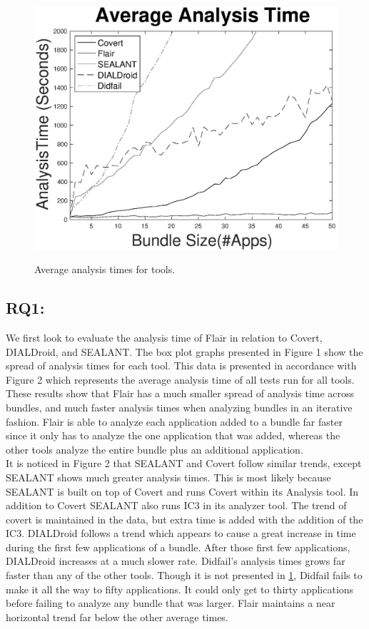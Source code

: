 \documentclass[twocolumn]{article}
\begin{document}
	\begin{figure}[H]
		\includegraphics[width=\linewidth]{AverageGraph}
		\label{figure:2}
		\caption{Average analysis times for tools.}
	\end{figure}
	
	\subsection{RQ1:}
		We first look to evaluate the analysis time of Flair in relation to Covert, DIALDroid, and SEALANT. The box plot graphs presented in Figure 1 show the spread of analysis times for each tool. This data is presented in accordance with Figure 2 which represents the average analysis time of all tests run for all tools. These results show that Flair has a much smaller spread of analysis time across bundles, and much faster analysis times when analyzing bundles in an iterative fashion. Flair is able to analyze each application added to a bundle far faster since it only has to analyze the one application that was added, whereas the other tools analyze the entire bundle plus an additional application.\\
		It is noticed in Figure 2 that SEALANT and Covert follow similar trends, except SEALANT shows much greater analysis times. This is most likely because SEALANT is built on top of Covert and runs Covert within its Analysis tool. In addition to Covert SEALANT also runs IC3 in its analyzer tool. The trend of covert is maintained in the data, but extra time is added with the addition of the IC3. DIALDroid follows a trend which appears to cause a great increase in time during the first few applications of a bundle. After those first few applications, DIALDroid increases at a much slower rate. Didfail's analysis times grows far faster than any of the other tools. Though it is not presented in \ref{figure:2}, Didfail fails to make it all the way to fifty applications. It could only get to thirty applications before failing to analyze any bundle that was larger. Flair maintains a near horizontal trend far below the other average times.
		
\end{document}
